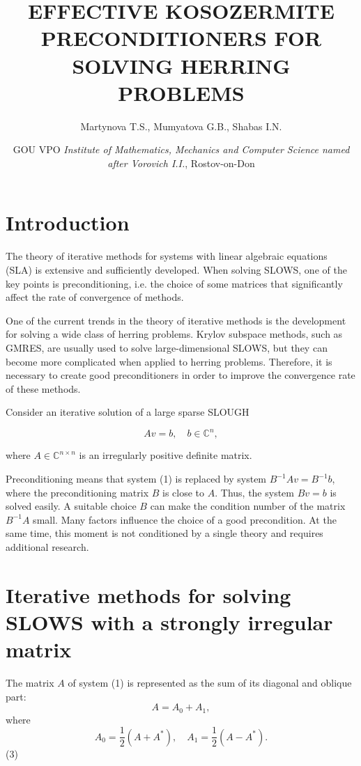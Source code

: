\documentclass{article}
\begin{document}
\title{EFFECTIVE KOSOZERMITE PRECONDITIONERS FOR SOLVING HERRING PROBLEMS}
\author{Martynova T.S., Mumyatova G.B., Shabas I.N.}
\date{GOU VPO \textit{Institute of Mathematics, Mechanics and Computer Science named after Vorovich I.I.}, Rostov-on-Don}
\maketitle

\section*{Introduction}

The theory of iterative methods for systems with linear algebraic equations (SLA) is extensive and sufficiently developed. When solving SLOWS, one of the key points is preconditioning, i.e. the choice of some matrices that significantly affect the rate of convergence of methods.

One of the current trends in the theory of iterative methods is the development for solving a wide class of herring problems. Krylov subspace methods, such as GMRES, are usually used to solve large-dimensional SLOWS, but they can become more complicated when applied to herring problems. Therefore, it is necessary to create good preconditioners in order to improve the convergence rate of these methods.

Consider an iterative solution of a large sparse SLOUGH

\[ Av = b, \quad b \in \mathbb{C}^n, \]

where \(A\in\mathbb{C}^{n\times n}\) is an irregularly positive definite matrix.

Preconditioning means that system (1) is replaced by system \(B^{-1}Av = B^{-1}b\), where the preconditioning matrix \(B\) is close to \(A\). Thus, the system \(Bv = b\) is solved easily. A suitable choice \(B\) can make the condition number of the matrix \(B^{-1}A\) small. Many factors influence the choice of a good precondition. At the same time, this moment is not conditioned by a single theory and requires additional research.

\section{Iterative methods for solving SLOWS with a strongly irregular matrix}

The matrix \(A\) of system (1) is represented as the sum of its diagonal and oblique part:
\[ A = A_0 + A_1, \]
where
\[A_0 = \frac{1}{2}(A + A^*), \quad A_1 = \frac{1}{2}(A - A^*). \] (3)
\end{document}
